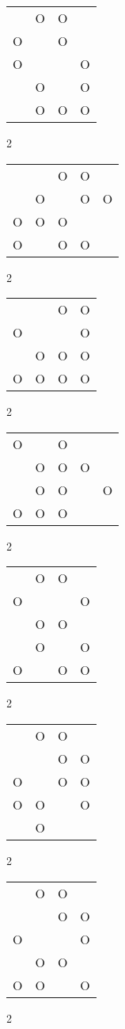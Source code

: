 \begin{tabular}{|m{0.2cm}m{0.2cm}m{0.2cm}m{0.2cm}|}\hline
 &O&O& \\
O& &O& \\
O& & &O\\
 &O& &O\\
 &O&O&O\\
\hline\end{tabular}2
\begin{tabular}{|m{0.2cm}m{0.2cm}m{0.2cm}m{0.2cm}m{0.2cm}|}\hline
 & &O&O& \\
 &O& &O&O\\
O&O&O& & \\
O& &O&O& \\
\hline\end{tabular}2
\begin{tabular}{|m{0.2cm}m{0.2cm}m{0.2cm}m{0.2cm}|}\hline
 & &O&O\\
O& & &O\\
 &O&O&O\\
O&O&O&O\\
\hline\end{tabular}2
\begin{tabular}{|m{0.2cm}m{0.2cm}m{0.2cm}m{0.2cm}m{0.2cm}|}\hline
O& &O& & \\
 &O&O&O& \\
 &O&O& &O\\
O&O&O& & \\
\hline\end{tabular}2
\begin{tabular}{|m{0.2cm}m{0.2cm}m{0.2cm}m{0.2cm}|}\hline
 &O&O& \\
O& & &O\\
 &O&O& \\
 &O& &O\\
O& &O&O\\
\hline\end{tabular}2
\begin{tabular}{|m{0.2cm}m{0.2cm}m{0.2cm}m{0.2cm}|}\hline
 &O&O& \\
 & &O&O\\
O& &O&O\\
O&O& &O\\
 &O& & \\
\hline\end{tabular}2
\begin{tabular}{|m{0.2cm}m{0.2cm}m{0.2cm}m{0.2cm}|}\hline
 &O&O& \\
 & &O&O\\
O& & &O\\
 &O&O& \\
O&O& &O\\
\hline\end{tabular}2
